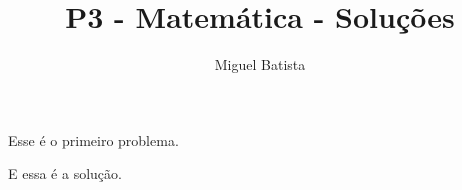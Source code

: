 \documentclass[10pt,a4paper]{article}
\title{P3 - Matemática - Soluções}
\author{Miguel Batista}
\begin{document}
	
	\zeustitle
	\begin{prob}\label{colegio:1}
		Esse é o primeiro problema.
	\end{prob}
	\begin{sol}
		E essa é a solução. 
	\end{sol}
\end{document}
